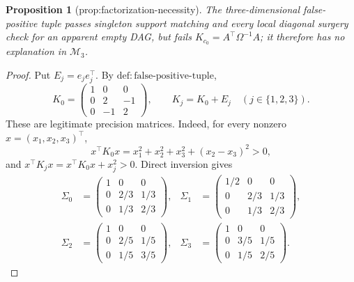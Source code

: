 \documentclass{article}
\newtheorem{proposition}{Proposition}
\begin{document}
\begin{proposition}[prop:factorization-necessity]\label{prop:factorization-necessity}
The three-dimensional false-positive tuple passes singleton support matching and every local diagonal surgery check for an apparent empty DAG, but fails \(K_{c_0}=A^{\top}\Omega^{-1}A\); it therefore has no explanation in \(\mathcal M_3\).
\end{proposition}
\begin{proof}
Put \(E_j=e_je_j^{\top}\).  By \(\mathrm{def:false\mbox{-}positive\mbox{-}tuple}\),
\[
 K_0=\begin{pmatrix}1&0&0\\0&2&-1\\0&-1&2\end{pmatrix},
 \qquad K_j=K_0+E_j\quad(j\in\{1,2,3\}).
\]
These are legitimate precision matrices.  Indeed, for every nonzero
\(x=(x_1,x_2,x_3)^{\top}\),
\[
 x^{\top}K_0x=x_1^2+x_2^2+x_3^2+(x_2-x_3)^2>0,
\]
and \(x^{\top}K_jx=x^{\top}K_0x+x_j^2>0\).  Direct inversion gives
\[
 \begin{aligned}
 \Sigma_0&=\begin{pmatrix}1&0&0\\0&2/3&1/3\\0&1/3&2/3\end{pmatrix},&
 \Sigma_1&=\begin{pmatrix}1/2&0&0\\0&2/3&1/3\\0&1/3&2/3\end{pmatrix},\\
 \Sigma_2&=\begin{pmatrix}1&0&0\\0&2/5&1/5\\0&1/5&3/5\end{pmatrix},&
 \Sigma_3&=\begin{pmatrix}1&0&0\\0&3/5&1/5\\0&1/5&2/5\end{pmatrix}.
 \end{aligned}
\]


\end{proof}
\end{document}
